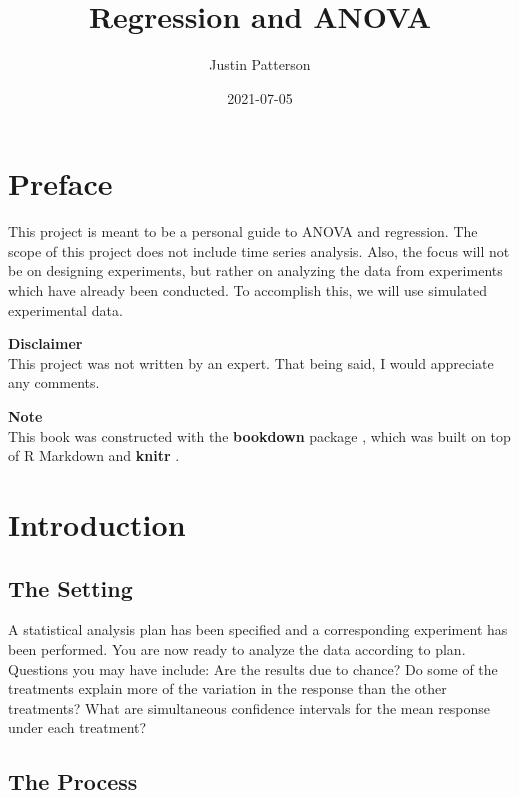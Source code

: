 \documentclass[
]{book}
\title{Regression and ANOVA}
\author{Justin Patterson}
\date{2021-07-05}
\begin{document}
\maketitle

{
\setcounter{tocdepth}{1}
\tableofcontents
}
\hypertarget{preface}{%
\chapter*{Preface}\label{preface}}

This project is meant to be a personal guide to ANOVA and regression. The scope of this project does not include time series analysis. Also, the focus will not be on designing experiments, but rather on analyzing the data from experiments which have already been conducted. To accomplish this, we will use simulated experimental data.

\textbf{Disclaimer}\\
This project was not written by an expert. That being said, I would appreciate any comments.

\textbf{Note}\\
This book was constructed with the \textbf{bookdown} package \autocite{R-bookdown}, which was built on top of R Markdown and \textbf{knitr} \autocite{xie2015}.

\hypertarget{intro}{%
\chapter{Introduction}\label{intro}}

\hypertarget{the-setting}{%
\section{The Setting}\label{the-setting}}

A statistical analysis plan has been specified and a corresponding experiment has been performed. You are now ready to analyze the data according to plan. Questions you may have include: Are the results due to chance? Do some of the treatments explain more of the variation in the response than the other treatments? What are simultaneous confidence intervals for the mean response under each treatment?

\hypertarget{the-process}{%
\section{The Process}\label{the-process}}
\end{document}
